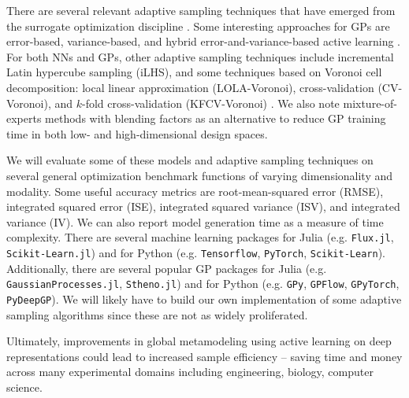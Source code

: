 \documentclass[conference]{IEEEtran}
\begin{document}
There are several relevant adaptive sampling techniques that have emerged from the surrogate optimization discipline \cite{Liu2018ADesign}. Some interesting approaches for GPs are error-based, variance-based, and hybrid error-and-variance-based active learning \cite{Liu2017AnError}. For both NNs and GPs, other adaptive sampling techniques include incremental Latin hypercube sampling (iLHS), and some techniques based on Voronoi cell decomposition: local linear approximation (LOLA-Voronoi), cross-validation (CV-Voronoi), and $k$-fold cross-validation (KFCV-Voronoi) \cite{Eason2014AdaptiveNetworks,Crombecq2009AModeling,Kaminsky2018AdaptiveSurfaces}. We also note mixture-of-experts methods with blending factors as an alternative to reduce GP training time in both low- and high-dimensional design spaces.

We will evaluate some of these models and adaptive sampling techniques on several general optimization benchmark functions of varying dimensionality and modality. Some useful accuracy metrics are root-mean-squared error (RMSE), integrated squared error (ISE), integrated squared variance (ISV), and integrated variance (IV). We can also report model generation time as a measure of time complexity. There are several machine learning packages for Julia (e.g. \texttt{Flux.jl}, \texttt{Scikit-Learn.jl}) and for Python (e.g. \texttt{Tensorflow}, \texttt{PyTorch}, \texttt{Scikit-Learn}). Additionally, there are several popular GP packages for Julia (e.g. \texttt{GaussianProcesses.jl}, \texttt{Stheno.jl}) and for Python (e.g. \texttt{GPy}, \texttt{GPFlow}, \texttt{GPyTorch}, \texttt{PyDeepGP}). We will likely have to build our own implementation of some adaptive sampling algorithms since these are not as widely proliferated.

Ultimately, improvements in global metamodeling using active learning on deep representations could lead to increased sample efficiency -- saving time and money across many experimental domains including engineering, biology, computer science.




\end{document}
